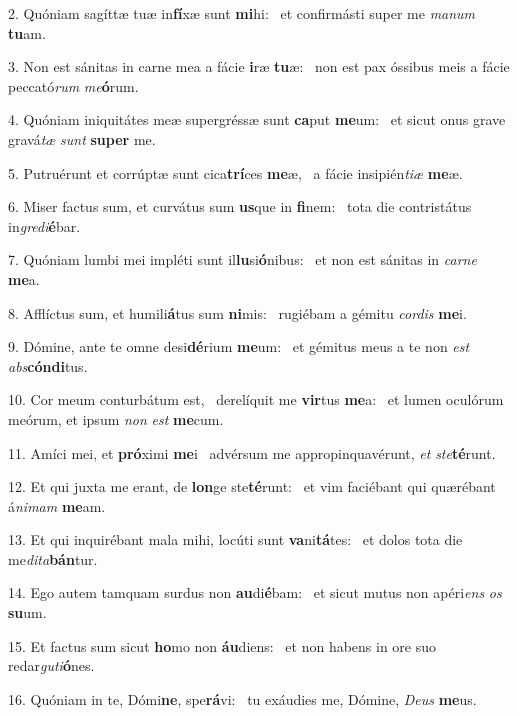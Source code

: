 2. Quóniam sagíttæ tuæ in\textbf{fí}xæ sunt \textbf{mi}hi: \ast\  et confirmásti super me \textit{ma}\textit{num} \textbf{tu}am.\

3. Non est sánitas in carne mea a fácie \textbf{i}ræ \textbf{tu}æ: \ast\  non est pax óssibus meis a fácie peccató\textit{rum} \textit{me}\textbf{ó}rum.\

4. Quóniam iniquitátes meæ supergréssæ sunt \textbf{ca}put \textbf{me}um: \ast\  et sicut onus grave gravá\textit{tæ} \textit{sunt} \textbf{su}\textbf{per} me.\

5. Putruérunt et corrúptæ sunt cica\textbf{trí}ces \textbf{me}æ, \ast\  a fácie insipién\textit{ti}\textit{æ} \textbf{me}æ.\

6. Miser factus sum, et curvátus sum \textbf{us}que in \textbf{fi}nem: \ast\  tota die contristátus in\textit{gre}\textit{di}\textbf{é}bar.\

7. Quóniam lumbi mei impléti sunt il\textbf{lu}si\textbf{ó}nibus: \ast\  et non est sánitas in \textit{car}\textit{ne} \textbf{me}a.\

8. Afflíctus sum, et humili\textbf{á}tus sum \textbf{ni}mis: \ast\  rugiébam a gémitu \textit{cor}\textit{dis} \textbf{me}i.\

9. Dómine, ante te omne desi\textbf{dé}rium \textbf{me}um: \ast\  et gémitus meus a te non \textit{est} \textit{abs}\textbf{cón}\textbf{di}tus.\

10. Cor meum conturbátum est, \dag\  derelíquit me \textbf{vir}tus \textbf{me}a: \ast\  et lumen oculórum meórum, et ipsum \textit{non} \textit{est} \textbf{me}cum.\

11. Amíci mei, et \textbf{pró}ximi \textbf{me}i \ast\  advérsum me appropinquavérunt, \textit{et} \textit{ste}\textbf{té}runt.\

12. Et qui juxta me erant, de \textbf{lon}ge ste\textbf{té}runt: \ast\  et vim faciébant qui quærébant á\textit{ni}\textit{mam} \textbf{me}am.\

13. Et qui inquirébant mala mihi, locúti sunt \textbf{va}ni\textbf{tá}tes: \ast\  et dolos tota die me\textit{di}\textit{ta}\textbf{bán}tur.\

14. Ego autem tamquam surdus non \textbf{au}di\textbf{é}bam: \ast\  et sicut mutus non apéri\textit{ens} \textit{os} \textbf{su}um.\

15. Et factus sum sicut \textbf{ho}mo non \textbf{áu}diens: \ast\  et non habens in ore suo redar\textit{gu}\textit{ti}\textbf{ó}nes.\

16. Quóniam in te, Dómi\textbf{ne}, spe\textbf{rá}vi: \ast\  tu exáudies me, Dómine, \textit{De}\textit{us} \textbf{me}us.\

